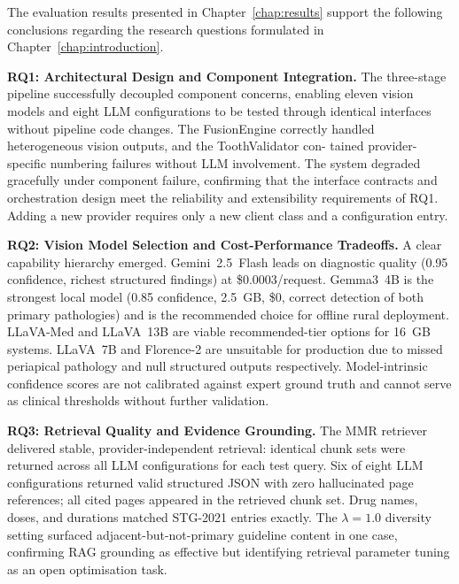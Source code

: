 \documentclass[12pt,a4paper]{report}
\begin{document}
The evaluation results presented in Chapter~\ref{chap:results} support the following conclusions
regarding the research questions formulated in Chapter~\ref{chap:introduction}.

\textbf{RQ1: Architectural Design and Component Integration.}
The three-stage pipeline
successfully decoupled component concerns, enabling eleven vision models and eight LLM
configurations to be tested through identical interfaces without pipeline code changes. The
FusionEngine correctly handled heterogeneous vision outputs, and the ToothValidator con-
tained provider-specific numbering failures without LLM involvement. The system degraded
gracefully under component failure, confirming that the interface contracts and orchestration
design meet the reliability and extensibility requirements of RQ1. Adding a new provider
requires only a new client class and a configuration entry.

\textbf{RQ2: Vision Model Selection and Cost-Performance Tradeoffs.}
A clear capability hierarchy emerged. Gemini~2.5~Flash leads on diagnostic
quality (0.95 confidence, richest structured findings) at \$0.0003/request.
Gemma3~4B is the strongest local model (0.85 confidence, 2.5~GB, \$0, correct
detection of both primary pathologies) and is the recommended choice for
offline rural deployment. LLaVA-Med and LLaVA~13B are viable recommended-tier
options for 16~GB systems. LLaVA~7B and Florence-2 are unsuitable for production
due to missed periapical pathology and null structured outputs respectively.
Model-intrinsic confidence scores are not calibrated against expert ground
truth and cannot serve as clinical thresholds without further validation.

\textbf{RQ3: Retrieval Quality and Evidence Grounding.}
The MMR retriever delivered stable, provider-independent retrieval: identical
chunk sets were returned across all LLM configurations for each test query.
Six of eight LLM configurations returned valid structured JSON with zero
hallucinated page references; all cited pages appeared in the retrieved chunk
set. Drug names, doses, and durations matched STG-2021 entries exactly.
The $\lambda{=}1.0$ diversity setting surfaced adjacent-but-not-primary guideline
content in one case, confirming RAG grounding as effective but identifying
retrieval parameter tuning as an open optimisation task.
\end{document}
